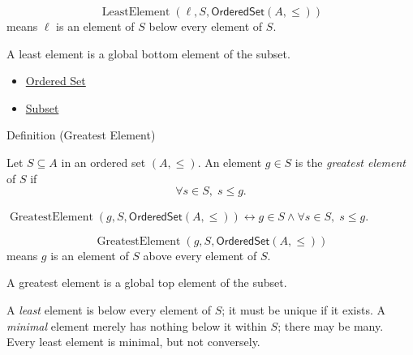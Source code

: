 \begin{remark*}
\[
  \operatorname{LeastElement}(\ell,S,\mathsf{OrderedSet}(A,\leq))
\] means
$\ell$ is an element of $S$ below every element of $S$.
\end{remark*}

\begin{remark*}[Interpretation]
A least element is a global bottom element of the subset.
\end{remark*}

\begin{dependencies}
\begin{itemize}
  \item \hyperref[def:ordered-set]{Ordered Set}
  \item \hyperref[def:subset]{Subset}
\end{itemize}
\end{dependencies}

\begin{definitionbox}{Definition (Greatest Element)}
\begin{definition}\label{def:order-greatest-element}
Let $S \subseteq A$ in an ordered set $(A,\leq)$. An element $g \in S$ is
the \emph{greatest element} of $S$ if
\[
\forall s \in S,\; s \leq g.
\]
\end{definition}
\end{definitionbox}

\begin{remark*}
$\operatorname{GreatestElement}(g,S,\mathsf{OrderedSet}(A,\leq))
\leftrightarrow g\in S\wedge \forall s\in S,\;s\leq g$.
\end{remark*}

\begin{remark*}
\[
  \operatorname{GreatestElement}(g,S,\mathsf{OrderedSet}(A,\leq))
\] means $g$
is an element of $S$ above every element of $S$.
\end{remark*}

\begin{remark*}[Interpretation]
A greatest element is a global top element of the subset.
\end{remark*}

\begin{remark*}[Exposition]
A \emph{least} element is below every element of $S$; it must be unique if it
exists. A \emph{minimal} element merely has nothing below it within $S$; there
may be many. Every least element is minimal, but not conversely.
\end{remark*}

